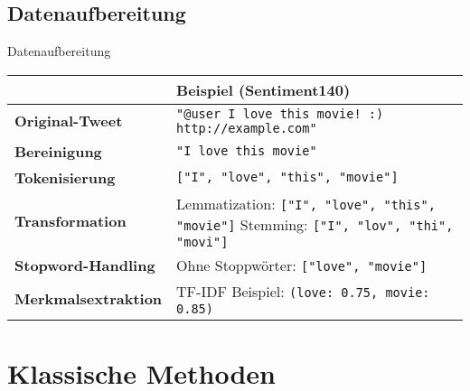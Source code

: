 \documentclass[aspectratio=169]{beamer} %
\begin{document}
\subsection{Datenaufbereitung}
\begin{frame}{Datenaufbereitung}
  \fontsize{10pt}{12pt}\selectfont
  \vspace{0.3cm}

  \begin{table}[]
      \centering
      \renewcommand{\arraystretch}{1.2}
      \begin{tabular}{l|p{7.5cm}}
          \hline
          & \textbf{Beispiel (Sentiment140)} \\
          \hline
          \textbf{Original-Tweet} & \texttt{"@user I love this movie! :) http://example.com"} \\
          \hline
          \textbf{Bereinigung} & \texttt{"I love this movie"} \\
          \hline
          \textbf{Tokenisierung} & \texttt{["I", "love", "this", "movie"]} \\
          \hline
          \textbf{Transformation} & Lemmatization: \texttt{["I", "love", "this", "movie"]} \newline
          Stemming: \texttt{["I", "lov", "thi", "movi"]} \\
          \hline
          \textbf{Stopword-Handling} & Ohne Stoppwörter: \texttt{["love", "movie"]} \\
          \hline
          \textbf{Merkmalsextraktion} & TF-IDF Beispiel: \newline
          \texttt{(love: 0.75, movie: 0.85)} \\
          \hline
      \end{tabular}
  \end{table}

\end{frame}

\section{Klassische Methoden}
\end{document}
